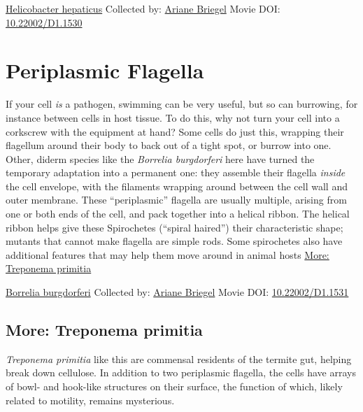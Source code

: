 \documentclass[]{tufte-book}
\begin{document}
\hypertarget{htmlwidget-0cfe332707c476a53633}{}

\label{fig:6-6}\protect\hyperlink{tree}{Helicobacter hepaticus} Collected by: \protect\hyperlink{ariane_briegel}{Ariane Briegel} Movie DOI: \href{https://doi.org/10.22002/D1.1530}{10.22002/D1.1530}

\hypertarget{periplasmic-flagella}{%
\section{Periplasmic Flagella}\label{periplasmic-flagella}}

If your cell \emph{is} a pathogen, swimming can be very useful, but so can burrowing, for instance between cells in host tissue. To do this, why not turn your cell into a corkscrew with the equipment at hand? Some cells do just this, wrapping their flagellum around their body to back out of a tight spot, or burrow into one. Other, diderm species like the \emph{Borrelia burgdorferi} here have turned the temporary adaptation into a permanent one: they assemble their flagella \emph{inside} the cell envelope, with the filaments wrapping around between the cell wall and outer membrane. These ``periplasmic'' flagella are usually multiple, arising from one or both ends of the cell, and pack together into a helical ribbon. The helical ribbon helps give these Spirochetes (``spiral haired'') their characteristic shape; mutants that cannot make flagella are simple rods. Some spirochetes also have additional features that may help them move around in animal hosts \protect\hyperlink{Treponema_primitia}{More: Treponema primitia}



\hypertarget{htmlwidget-a4310c41dceabbfeb120}{}

\label{fig:6-7}\protect\hyperlink{tree}{Borrelia burgdorferi} Collected by: \protect\hyperlink{ariane_briegel}{Ariane Briegel} Movie DOI: \href{https://doi.org/10.22002/D1.1531}{10.22002/D1.1531}

\hypertarget{Treponema_primitia}{%
\subsection*{More: Treponema primitia}\label{Treponema_primitia}}

\emph{Treponema primitia} like this are commensal residents of the termite gut, helping break down cellulose. In addition to two periplasmic flagella, the cells have arrays of bowl- and hook-like structures on their surface, the function of which, likely related to motility, remains mysterious.
\end{document}

